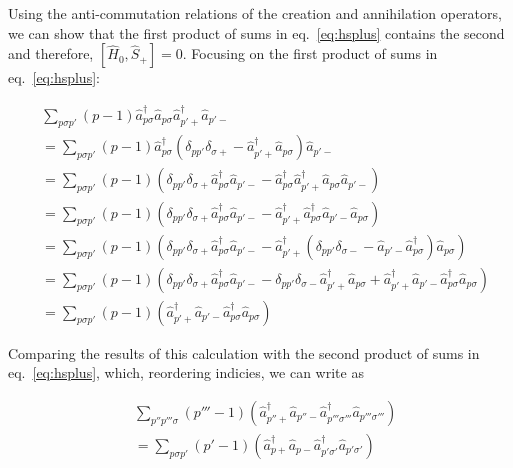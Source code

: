 \documentclass[11pt]{article}
\newcommand{\cop}[2]{%
	\ensuremath{ \hat{a} _{#1 #2} ^{\dagger} }}
\newcommand{\aop}[2]{%
	\ensuremath{ \hat{a} _{#1 #2} }}
\newcommand{\sop}[1]{%
	\ensuremath{ \hat{S}_{#1} } }
\newcommand{\krondelt}[2]{%
	\ensuremath{ \delta _{#1 #2} }}
\newcommand{\hop}{
	\ensuremath{ \hat{H} _0 }}
\newcommand{\commutator}[2]{%
	\ensuremath{ \left [ #1,#2 \right ] }}
\begin{document}
Using the anti-commutation relations of the creation and annihilation operators, we can show that the first product of sums in eq.~\ref{eq:hsplus} contains the second and therefore, $ \commutator{\hop}{\sop{+}} =0$. Focusing on the first product of sums in eq.~\ref{eq:hsplus}:

\begin{align}
	& \sum_{p \sigma p'} (p-1) \cop{p}{\sigma} \aop{p}{\sigma} \cop{p'}{+} \aop{p'}{-}\\
	&= \sum_{p \sigma p'} (p-1) \cop{p}{\sigma} \left (\krondelt{p}{p'} \krondelt{\sigma}{+} -  \cop{p'}{+} \aop{p}{\sigma} \right ) \aop{p'}{-}\\
	&= \sum_{p \sigma p'} (p-1) \left ( \krondelt{p}{p'} \krondelt{\sigma}{+} \cop{p}{\sigma} \aop{p'}{-} - \cop{p}{\sigma}  \cop{p'}{+} \aop{p}{\sigma} \aop{p'}{-} \right )\\
	&= \sum_{p \sigma p'} (p-1) \left ( \krondelt{p}{p'} \krondelt{\sigma}{+} \cop{p}{\sigma} \aop{p'}{-} - \cop{p'}{+} \cop{p}{\sigma} \aop{p'}{-} \aop{p}{\sigma} \right )\\
	&= \sum_{p \sigma p'} (p-1) \left ( \krondelt{p}{p'} \krondelt{\sigma}{+} \cop{p}{\sigma} \aop{p'}{-} - \cop{p'}{+} \left ( \krondelt{p}{p'} \krondelt{\sigma}{-} - \aop{p'}{-} \cop{p}{\sigma} \right ) \aop{p}{\sigma} \right )\\
	&= \sum_{p \sigma p'} (p-1) \left ( \krondelt{p}{p'} \krondelt{\sigma}{+} \cop{p}{\sigma} \aop{p'}{-} - \krondelt{p}{p'} \krondelt{\sigma}{-} \cop{p'}{+} \aop{p}{\sigma} + \cop{p'}{+} \aop{p'}{-} \cop{p}{\sigma} \aop{p}{\sigma} \right )\\
	&= \sum_{p \sigma p'} (p-1) \left ( \cop{p'}{+} \aop{p'}{-} \cop{p}{\sigma} \aop{p}{\sigma} \right )
\end{align}

Comparing the results of this calculation with the second product of sums in eq.~\ref{eq:hsplus}, which, reordering indicies, we can write as

\begin{align*}
	& \sum_{p'' p''' \sigma} (p''' -1) \left ( \cop{p''}{+} \aop{p''}{-}\cop{p'''}{\sigma'''}\aop{p'''}{\sigma'''} \right )\\
	&= \sum_{p \sigma p' } (p' -1) \left ( \cop{p}{+} \aop{p}{-} \cop{p'}{\sigma'} \aop{p'}{\sigma'} \right )
\end{align*}
\end{document}
